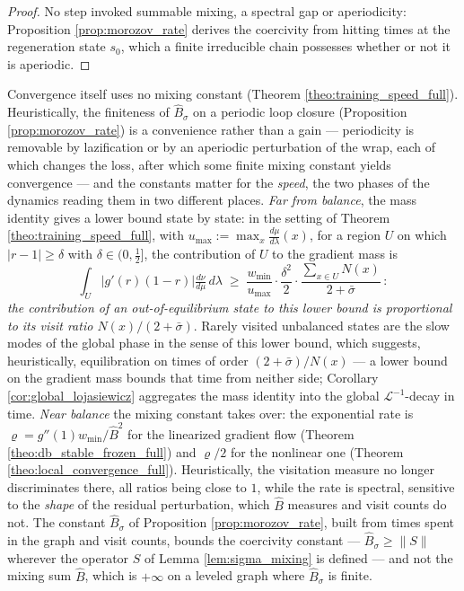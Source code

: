\begin{proof}
No step invoked summable mixing, a spectral gap or aperiodicity: Proposition \ref{prop:morozov_rate} derives the coercivity from hitting times at the regeneration state $s_0$, which a finite irreducible chain possesses whether or not it is aperiodic.
\end{proof}

\begin{remark}\label{rem:visit_ratio}
Convergence itself uses no mixing constant (Theorem \ref{theo:training_speed_full}). Heuristically, the finiteness of $\widehat B_\sigma$ on a periodic loop closure (Proposition \ref{prop:morozov_rate}) is a convenience rather than a gain --- periodicity is removable by lazification or by an aperiodic perturbation of the wrap, each of which changes the loss, after which some finite mixing constant yields convergence --- and the constants matter for the \emph{speed}, the two phases of the dynamics reading them in two different places. \emph{Far from balance}, the mass identity gives a lower bound state by state: in the setting of Theorem \ref{theo:training_speed_full}, with $u_{\max}:=\max_x\frac{d\mu}{d\lambda}(x)$, for a region $U$ on which $|r-1|\geq\delta$ with $\delta\in(0,\frac12]$, the contribution of $U$ to the gradient mass is
\begin{equation*}
    \int_U|g'(r)(1-r)|\tfrac{d\nu}{d\mu}\,d\lambda\;\geq\;\frac{w_{\min}}{u_{\max}}\cdot\frac{\delta^2}2\cdot\frac{\sum_{x\in U}N(x)}{2+\bar\sigma}\,:
\end{equation*}
\emph{the contribution of an out-of-equilibrium state to this lower bound is proportional to its visit ratio $N(x)/(2+\bar\sigma)$}. Rarely visited unbalanced states are the slow modes of the global phase in the sense of this lower bound, which suggests, heuristically, equilibration on times of order $(2+\bar\sigma)/N(x)$ --- a lower bound on the gradient mass bounds that time from neither side; Corollary \ref{cor:global_lojasiewicz} aggregates the mass identity into the global $\mathcal L^{-1}$-decay in time. \emph{Near balance} the mixing constant takes over: the exponential rate is $\varrho=g''(1)w_{\min}/\widehat B^2$ for the linearized gradient flow (Theorem \ref{theo:db_stable_frozen_full}) and $\varrho/2$ for the nonlinear one (Theorem \ref{theo:local_convergence_full}). Heuristically, the visitation measure no longer discriminates there, all ratios being close to $1$, while the rate is spectral, sensitive to the \emph{shape} of the residual perturbation, which $\widehat B$ measures and visit counts do not. The constant $\widehat B_\sigma$ of Proposition \ref{prop:morozov_rate}, built from times spent in the graph and visit counts, bounds the coercivity constant --- $\widehat B_\sigma\geq\|S\|$ wherever the operator $S$ of Lemma \ref{lem:sigma_mixing} is defined --- and not the mixing sum $\widehat B$, which is $+\infty$ on a leveled graph where $\widehat B_\sigma$ is finite.
\end{remark}


